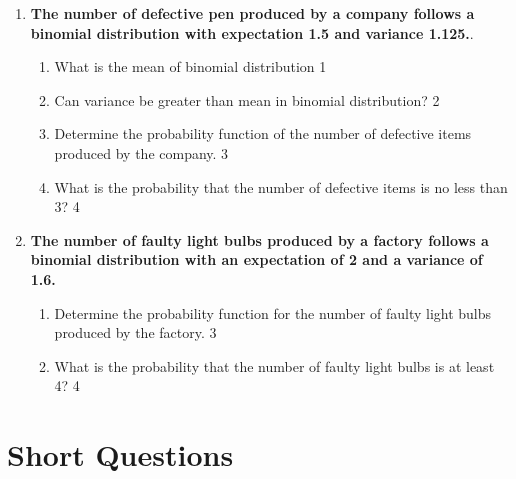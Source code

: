 \documentclass[a4paper,oneside, margin=1.4in]{book}
\begin{document}
\begin{enumerate}
 \item
	  \textbf{The number of defective pen produced by a company follows a 
	  binomial distribution with expectation 1.5 and variance 1.125.}. 
  
  \begin{enumerate}
    \item
	What is the mean of binomial distribution \hfill 1
    \item
	Can variance be greater than mean in binomial distribution? \hfill 2
    \item  
	Determine the probability function of the number of defective items 
	produced by the company. \hfill 3
    \item
	What is the probability that the number of defective items is no
	less than 3? \hfill 4
  \end{enumerate}
  \item
	  \textbf{The number of faulty light bulbs produced by a factory 
	  follows a binomial distribution with an expectation of 2 and a 
	  variance of 1.6.} 
  
  \begin{enumerate}
    \item  
	Determine the probability function for the number of faulty light 
	bulbs produced by the factory. \hfill 3
    \item
	What is the probability that the number of faulty light bulbs is 
	at least 4? \hfill 4
  \end{enumerate}

  
  \end{enumerate}

\section{Short Questions}
\end{document}
